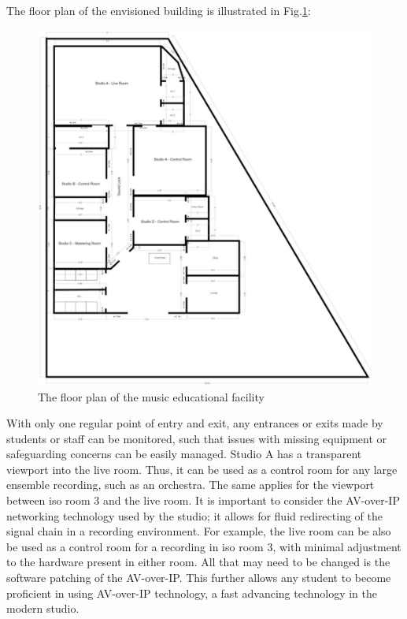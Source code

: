 \documentclass[10pt, twocolumn]{article}
\begin{document}
        The floor plan of the envisioned building is illustrated in Fig.\ref{floorplan}:
        \begin{figure}
            \centering
            \centerline{\includegraphics[scale = 0.8]{resources/floorplan.png}}
            \caption{The floor plan of the music educational facility}
            \label{floorplan}
        \end{figure}
        With only one regular point of entry and exit, any entrances or exits made by students or staff can be monitored, such that issues with missing equipment or safeguarding concerns can be easily managed.
        Studio A has a transparent viewport into the live room.
        Thus, it can be used as a control room for any large ensemble recording, such as an orchestra.
        The same applies for the viewport between iso room 3 and the live room.
        It is important to consider the AV-over-IP networking technology used by the studio; it allows for fluid redirecting of the signal chain in a recording environment.
        For example, the live room can be also be used as a control room for a recording in iso room 3, with minimal adjustment to the hardware present in either room.
        All that may need to be changed is the software patching of the AV-over-IP.
        This further allows any student to become proficient in using AV-over-IP technology, a fast advancing technology in the modern studio.
        \newpage
\end{document}

